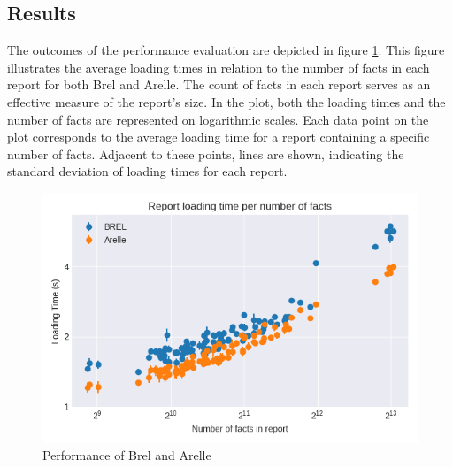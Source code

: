 \subsection{Results}

The outcomes of the performance evaluation are depicted in figure \ref{fig:performance}.  
This figure illustrates the average loading times in relation to the number of facts in each report for both Brel and Arelle.  
The count of facts in each report serves as an effective measure of the report's size.  
In the plot, both the loading times and the number of facts are represented on logarithmic scales.  
Each data point on the plot corresponds to the average loading time for a report containing a specific number of facts.  
Adjacent to these points, lines are shown, indicating the standard deviation of loading times for each report.

\begin{figure}[H]
    \centering
    \includegraphics[width=\textwidth]{images/performance_graph.png}
    \caption{Performance of Brel and Arelle}
    \label{fig:performance}
\end{figure}

